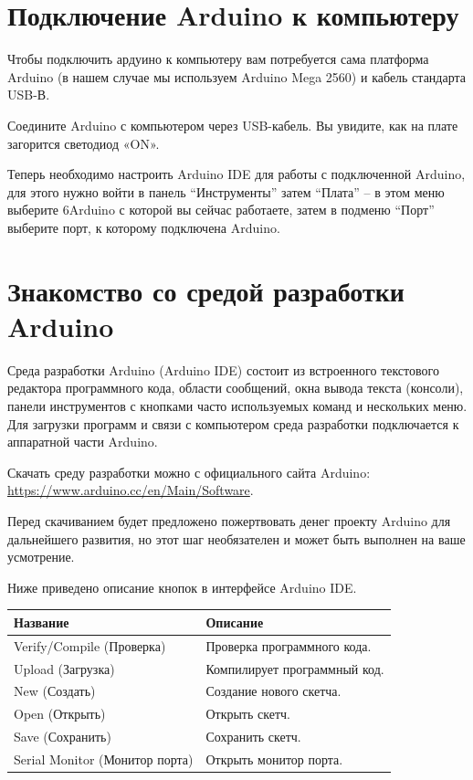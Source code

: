 \documentclass[a4paper,twoside]{book}
\begin{document}
\section{Подключение Arduino к компьютеру}
Чтобы подключить ардуино к компьютеру вам потребуется сама платформа Arduino (в
нашем случае мы используем Arduino Mega 2560) и кабель стандарта USB-В.

Соедините Arduino с компьютером через USB-кабель. Вы увидите, как на плате
загорится светодиод «ON».

Теперь необходимо настроить Arduino IDE для работы с подключенной Arduino, для
этого нужно войти в панель “Инструменты” затем “Плата” -- в этом меню выберите
6Arduino с которой вы сейчас работаете, затем в подменю “Порт” выберите порт, к
которому подключена Arduino.

\section{Знакомство со средой разработки Arduino}
Среда разработки Arduino (Arduino IDE) состоит из встроенного текстового
редактора программного кода, области сообщений, окна вывода текста (консоли),
панели инструментов с кнопками часто используемых команд и нескольких меню. Для
загрузки программ и связи с компьютером среда разработки подключается к
аппаратной части Arduino.

Скачать среду разработки можно с официального сайта Arduino:
\url{https://www.arduino.cc/en/Main/Software}.

Перед скачиванием будет предложено пожертвовать денег проекту Arduino для
дальнейшего развития, но этот шаг необязателен и может быть выполнен на ваше
усмотрение.

Ниже приведено описание кнопок в интерфейсе Arduino IDE.

\begin{tabular}{p{4cm}|p{6cm}}
  Название & Описание \\
  \hline \hline
  Verify/Compile (Проверка) & Проверка программного кода. \\
  \hline
  Upload (Загрузка) & Компилирует программный код.\\
  \hline
  New (Создать) & Создание нового скетча.\\
  \hline
  Open (Открыть) & Открыть скетч.\\
  \hline
  Save (Сохранить) & Сохранить скетч.\\
  \hline
  Serial Monitor (Монитор порта) & Открыть монитор порта.\\
\end{tabular}
\end{document}
